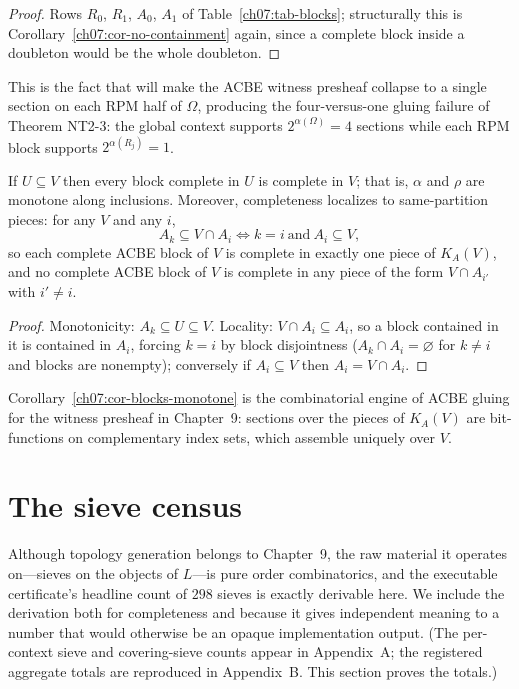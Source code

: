 \begin{proof}
Rows $R_{0}$, $R_{1}$, $A_{0}$, $A_{1}$ of Table~\ref{ch07:tab-blocks}; structurally this is Corollary~\ref{ch07:cor-no-containment} again, since a complete block inside a doubleton would be the whole doubleton.
\end{proof}

This is the fact that will make the ACBE witness presheaf collapse to a single section on each RPM half of $\Omega$, producing the four-versus-one gluing failure of Theorem NT2-3: the global context supports $2^{\alpha(\Omega)}=4$ sections while each RPM block supports $2^{\alpha(R_{j})}=1$.

\begin{corollary}\label{ch07:cor-blocks-monotone}
If $U\subseteq V$ then every block complete in $U$ is complete in $V$; that is, $\alpha$ and $\rho$ are monotone along inclusions. Moreover, completeness localizes to same-partition pieces: for any $V$ and any $i$,
\[
A_{k}\subseteq V\cap A_{i}
\iff
k=i \ \text{and}\ A_{i}\subseteq V,
\]
so each complete ACBE block of $V$ is complete in exactly one piece of $K_{A}(V)$, and no complete ACBE block of $V$ is complete in any piece of the form $V\cap A_{i'}$ with $i'\neq i$.
\end{corollary}

\begin{proof}
Monotonicity: $A_{k}\subseteq U\subseteq V$. Locality: $V\cap A_{i}\subseteq A_{i}$, so a block contained in it is contained in $A_{i}$, forcing $k=i$ by block disjointness ($A_{k}\cap A_{i}=\varnothing$ for $k\neq i$ and blocks are nonempty); conversely if $A_{i}\subseteq V$ then $A_{i}=V\cap A_{i}$.
\end{proof}

Corollary~\ref{ch07:cor-blocks-monotone} is the combinatorial engine of ACBE gluing for the witness presheaf in Chapter~9: sections over the pieces of $K_{A}(V)$ are bit-functions on complementary index sets, which assemble uniquely over $V$.

\section{The sieve census}\label{ch07:sec-sieves}

Although topology generation belongs to Chapter~9, the raw material it operates on---sieves on the objects of $L$---is pure order combinatorics, and the executable certificate's headline count of $298$ sieves is exactly derivable here. We include the derivation both for completeness and because it gives independent meaning to a number that would otherwise be an opaque implementation output. (The per-context sieve and covering-sieve counts appear in Appendix~A; the registered aggregate totals are reproduced in Appendix~B. This section proves the totals.)

